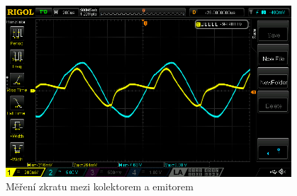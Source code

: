 \documentclass{article}
\begin{document}
\begin{figure}[H]
  \centering
  \includegraphics[width=0.95\textwidth]{mereni/NewFolder1/NewFile14.png}
  \caption{Měření zkratu mezi kolektorem a emitorem}
  \label{fig:m-sch-sc-p6}
\end{figure}





\end{document}
